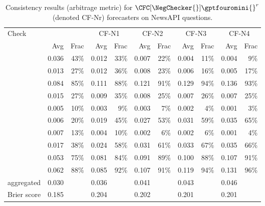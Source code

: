 {
\small %
\setlength{\tabcolsep}{0.46em}
\begin{table}[htbp]
\caption{Consistency results (arbitrage metric) for $\CFC[\NegChecker{}]{\gptfouromini{}}^r$ (denoted CF-Nr) forecasters on NewsAPI questions.}
\begin{tabular}{lrrrrrrrrrr}
\toprule
Check & \multicolumn{2}{c}{\gptfouromini{}} & \multicolumn{2}{c}{CF-N1} & \multicolumn{2}{c}{CF-N2} & \multicolumn{2}{c}{CF-N3} & \multicolumn{2}{c}{CF-N4} \\
 & Avg & Frac & Avg & Frac & Avg & Frac & Avg & Frac & Avg & Frac \\
\midrule
\NegChecker{} & 0.036 & 43\% & 0.012 & 33\% & 0.007 & 22\% & 0.004 & 11\% & 0.004 & 9\% \\
\ParaphraseChecker{} & 0.013 & 27\% & 0.012 & 36\% & 0.008 & 23\% & 0.006 & 16\% & 0.005 & 17\% \\
\CondCondChecker{} & 0.084 & 85\% & 0.111 & 88\% & 0.121 & 91\% & 0.129 & 94\% & 0.136 & 93\% \\
\ExpectedEvidenceChecker{} & 0.015 & 27\% & 0.009 & 35\% & 0.008 & 25\% & 0.007 & 26\% & 0.007 & 25\% \\
\ConsequenceChecker{} & 0.005 & 10\% & 0.003 & 9\% & 0.003 & 7\% & 0.002 & 4\% & 0.001 & 3\% \\
\AndChecker{} & 0.006 & 20\% & 0.019 & 45\% & 0.027 & 53\% & 0.031 & 59\% & 0.035 & 65\% \\
\OrChecker{} & 0.007 & 13\% & 0.004 & 10\% & 0.002 & 6\% & 0.002 & 6\% & 0.001 & 4\% \\
\AndOrChecker{} & 0.017 & 38\% & 0.024 & 58\% & 0.031 & 61\% & 0.033 & 67\% & 0.035 & 66\% \\
\ButChecker{} & 0.053 & 75\% & 0.081 & 84\% & 0.091 & 89\% & 0.100 & 88\% & 0.107 & 91\% \\
\CondChecker{} & 0.062 & 88\% & 0.085 & 92\% & 0.107 & 91\% & 0.119 & 94\% & 0.131 & 96\% \\
aggregated & 0.030 &  & 0.036 &  & 0.041 &  & 0.043 &  & 0.046 &  \\
Brier score & 0.185 &  & 0.204 &  & 0.202 &  & 0.201 &  & 0.201 &  \\
\bottomrule
\end{tabular}
\label{cfc:tab:cf-nx}
\end{table}


}
